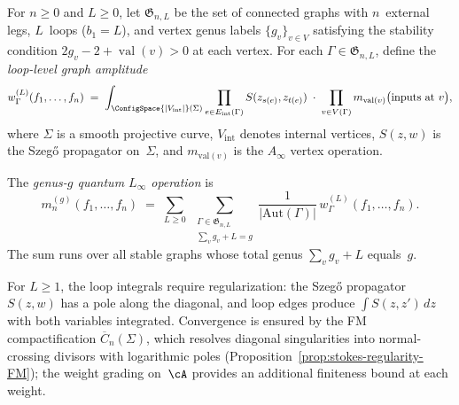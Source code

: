 \begin{definition}
\label{def:loop-level-graph-ops}
For $n \geq 0$ and $L \geq 0$, let
$\mathfrak{G}_{n,L}$ be the set of connected graphs with
$n$~external legs, $L$~loops ($b_1 = L$), and vertex genus
labels $\{g_v\}_{v \in V}$ satisfying the stability condition
$2g_v - 2 + \operatorname{val}(v) > 0$ at each vertex.
For each $\Gamma \in \mathfrak{G}_{n,L}$, define the
\emph{loop-level graph amplitude}
\begin{equation}\label{eq:loop-amplitude}
w_\Gamma^{(L)}(f_1, \ldots, f_n)
\;=\;
\int_{\ConfigSpace{|V_{\mathrm{int}}|}(\Sigma)}
\prod_{e \in E_{\mathrm{int}}(\Gamma)} S(z_{s(e)}, z_{t(e)})
\;\cdot\;
\prod_{v \in V(\Gamma)} m_{\mathrm{val}(v)}
\bigl(\text{inputs at } v\bigr),
\end{equation}
where $\Sigma$ is a smooth projective curve,
$V_{\mathrm{int}}$ denotes internal vertices, $S(z,w)$ is
the Szeg\H{o} propagator on~$\Sigma$, and
$m_{\mathrm{val}(v)}$ is the $A_\infty$ vertex operation.

The \emph{genus-$g$ quantum $L_\infty$ operation} is
\begin{equation}\label{eq:quantum-linf-operation}
m_n^{(g)}(f_1, \ldots, f_n)
\;=\;
\sum_{L \geq 0}\;
\sum_{\substack{\Gamma \in \mathfrak{G}_{n,L} \\
  \sum_v g_v + L = g}}
\frac{1}{|\mathrm{Aut}(\Gamma)|}
\, w_\Gamma^{(L)}(f_1, \ldots, f_n).
\end{equation}
The sum runs over all stable graphs whose total genus
$\sum_v g_v + L$ equals~$g$.

For $L \geq 1$, the loop integrals require regularization: the
Szeg\H{o} propagator $S(z,w)$ has a pole along the diagonal, and
loop edges produce $\int S(z,z')\, dz$ with both variables
integrated.  Convergence is ensured by the FM compactification
$\overline{C}_n(\Sigma)$, which resolves diagonal singularities
into normal-crossing divisors with logarithmic poles
(Proposition~\ref{prop:stokes-regularity-FM}); the
weight grading on~$\cA$ provides an additional finiteness
bound at each weight.
\end{definition}

